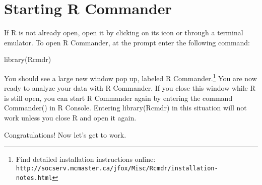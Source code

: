  \section{Starting R Commander}
If R is not already open, open it by clicking on its icon or through a terminal emulator. To open R Commander, at the prompt enter the following command:

library(Rcmdr)

You should see a large new window pop up, labeled R Commander.\footnote{Find detailed installation instructions online: \texttt{http://socserv.mcmaster.ca/jfox/Misc/Rcmdr/installation-notes.html}} You are now ready to analyze your data with R Commander. If you close this window while R is still open, you can start R Commander again by entering the command Commander() in R Console. Entering library(Rcmdr) in this situation will not work unless you close R and open it again.

Congratulations! Now let's get to work.